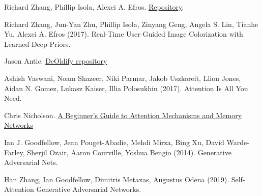 \documentclass[twoside,twocolumn]{article}
\begin{document}
\begin{thebibliography}{99}
Richard Zhang, Phillip Isola, Alexei A. Efros.
\newblock \href{https://github.com/richzhang/colorization}{Repository}.

Richard Zhang, Jun-Yan Zhu, Phillip Isola, Zinyang Geng, Angela S. Lin, Tianhe Yu, Alexei A. Efros (2017).
\newblock Real-Time User-Guided Image Colorization with Learned Deep Priors.

Jason Antic.
\newblock \href{https://github.com/jantic/DeOldify}{DeOldify repository}

Ashish Vaswani, Noam Shazeer, Niki Parmar, Jakob Uszkoreit, Llion Jones, Aidan N. Gomez, Lukasz Kaiser, Illia Polosukhin (2017).
\newblock Attention Is All You Need.

Chris Nicholson.
\newblock \href{https://skymind.ai/wiki/attention-mechanism-memory-network}{A Beginner's Guide to Attention Mechanisms and Memory Networks}

Ian J. Goodfellow, Jean Pouget-Abadie, Mehdi Mirza, Bing Xu, David Warde-Farley,
Sherjil Ozair, Aaron Courville, Yoshua Bengio (2014).
\newblock Generative Adversarial Nets.

Han Zhang, Ian Goodfellow, Dimitris Metaxas, Augustus Odena (2019).
\newblock Self-Attention Generative Adversarial Networks.



\end{thebibliography}

\end{document}
